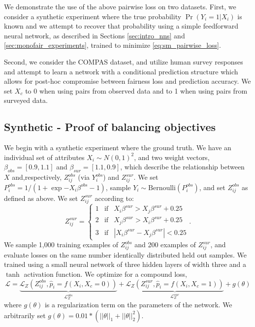     We demonstrate the use of the above pairwise loss on two datasets.  First, we consider a synthetic experiment where the true probability $\Pr(Y_i = 1 | X_i)$ is known and we attempt to recover that probability using a simple feedforward neural network, as described in Sections \ref{sec:intro_nns} and \ref{sec:monofair_experiments}, trained to minimize \ref{eq:sm_pairwise_loss}.  
    
    Second, we consider the COMPAS dataset, and utilize human survey responses and attempt to learn a network with a conditional prediction structure which allows for post-hoc compromise between fairness loss and prediction accuracy.  We set $X_{c}$ to 0 when using pairs from observed data and to 1 when using pairs from surveyed data.

    \subsection{Synthetic - Proof of balancing objectives}
    
        We begin with a synthetic experiment where the ground truth.  We have an individual set of attributes $X_i \sim N(0, 1)^2$, and two weight vectors,  $\beta_{obs} = [0.9, 1.1]$ and $\beta_{sur} = [1.1, 0.9]$, which describe the relationship between $X$ and,respectively,  $Z_{ij}^{obs}$ (via $Y_{i}^{obs}$) and $Z_{ij}^{sur}$.  We set $P_i^{obs} = 1 / (1 + \exp{-X_i \beta^{obs} - 1})$, sample $Y_i \sim \mbox{Bernoulli}(P_i^{obs})$, and set $Z_{ij}^{obs}$ as defined as above.  We set $Z_{ij}^{sur}$ according to:
            $$ Z_{ij}^{sur} = \left\{ \begin{array}{lll}
                    1 & \mbox{if} & X_{i}\beta^{sur} > X_{j}\beta^{sur} + 0.25\\
                    2 & \mbox{if} & X_{j}\beta^{sur} > X_{i}\beta^{sur} + 0.25 \\
                    3 & \mbox{if} & | X_{i}\beta^{sur} - X_{j}\beta^{sur} | < 0.25
                \end{array} \right. .$$
        We sample 1,000 training examples of $Z_{ij}^{obs}$ and 200 examples of $Z_{ij}^{sur}$, and evaluate losses on the same number identically distributed held out samples.  We trained using a small neural network of three hidden layers of width three and a $\tanh$ activation function. We optimize for a compound loss,
            $$\mathcal{L} = \underbrace{\mathcal{L}_Z\left(Z_{ij}^{obs}, \hat{p}_i = f(X_i, X_c = 0)\right)}_{\mathcal{L}_Z^{obs}}
                          + \underbrace{\mathcal{L}_Z\left(Z_{ij}^{sur}, \hat{p}_i = f(X_i, X_c = 1)\right)}_{\mathcal{L}_Z^{sur}} 
                          + g(\theta)$$
        where $g(\theta)$ is a regularization term on the parameters of the network.  We arbitrarily set $g(\theta) = 0.01 * \left(||\theta||_1 + ||\theta||_2^2\right)$.
        
